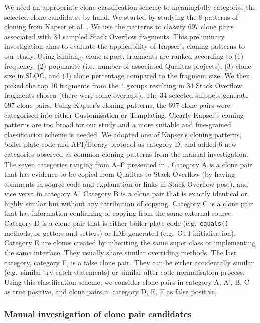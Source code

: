 \documentclass{sig-alternate-05-2015}
\begin{document}
We need an appropriate clone classification scheme to meaningfully categorise the selected clone candidates by hand. We started by studying the 8 patterns of cloning from Kapser et al. \cite{Kapser2006,Kapser2008}. We use the patterns to classify 697 clone pairs associated with 34 sampled Stack Overflow fragments. This preliminary investigation aims to evaluate the applicability of Kapser's cloning patterns to our study. Using Simian$_{df}$ clone report, fragments are ranked according to (1) frequency, (2) popularity (i.e.~number of associated Qualitas projects), (3) clone size in SLOC, and (4) clone percentage compared to the fragment size. We then picked the top 10 fragments from the 4 groups resulting in 34 Stack Overflow fragments chosen (there were some overlaps). The 34 selected snippets generate 697 clone pairs. Using Kapser's cloning patterns, the 697 clone pairs were categorised into either Customisation or Templating. Clearly Kapser's cloning patterns are too broad for our study and a more suitable and fine-grained classification scheme is needed. We adopted one of Kapser's cloning patterns, boiler-plate code and API/library protocol as category D, and added 6 new categories observed as common cloning patterns from the manual investigation. The seven categories ranging from A--F presented in . Category A is a clone pair that has evidence to be copied from Qualitas to Stack Overflow (by having comments in source code and explanation or links in Stack Overflow post), and vice versa in category A'. Category B is a clone pair that is exactly identical or highly similar but without any attribution of copying. Category C is a clone pair that has information confirming of copying from the same external source. Category D is a clone pair that is either boiler-plate code (e.g.~\verb|equals()| methods, or getters and setters) or IDE-generated (e.g.~GUI initialisation). Category E are clones created by inheriting the same super class or implementing the same interface. They usually share similar overriding methods. The last category, category F, is a false clone pair. They can be either accidentally similar (e.g.~similar try-catch statements) or similar after code normalisation process. Using this classification scheme, we consider clone pairs in category A, A', B, C as true positive, and clone pairs in category D, E, F as false positive. 

\subsubsection{Manual investigation of clone pair candidates}
\end{document}
